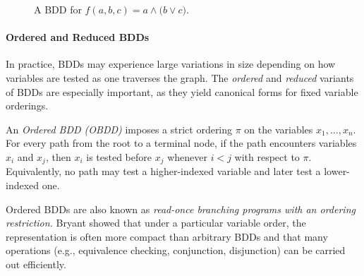 \usetikzlibrary{shapes,arrows}
\usetikzlibrary{intersections}
\begin{figure}[htbp]
\centering
{}
\caption{A BDD for $f(a,b,c)=a \land \bigl(b \lor c\bigr)$.}
\label{fig:example_bdd}
\end{figure}

\paragraph{Ordered and Reduced BDDs}
In practice, BDDs may experience large variations in size depending on how variables are tested as one traverses the graph. The \textit{ordered} and \textit{reduced} variants of BDDs are especially important, as they yield canonical forms for fixed variable orderings.

\begin{definition}
\label{def:obdd}
An \emph{Ordered BDD (OBDD)} imposes a strict ordering $\pi$ on the variables ${x_1,\dots,x_n}$. For every path from the root to a terminal node, if the path encounters variables $x_i$ and $x_j$, then $x_i$ is tested before $x_j$ whenever $i<j$ with respect to $\pi$. Equivalently, no path may test a higher-indexed variable and later test a lower-indexed one.
\end{definition}

Ordered BDDs are also known as \emph{read-once branching programs with an ordering restriction.} Bryant showed that under a particular variable order, the representation is often more compact than arbitrary BDDs and that many operations (e.g., equivalence checking, conjunction, disjunction) can be carried out efficiently.

